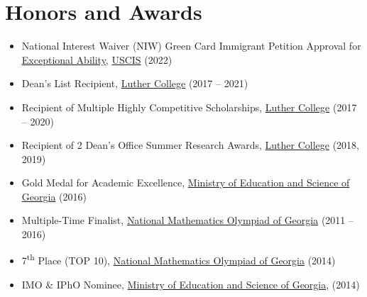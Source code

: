 \documentclass[a4paper]{article}
\newcommand{\entriesbegin}{\begin{itemize}[leftmargin=*]}
\newcommand{\entriesend}{\end{itemize}}
\newcommand{\entrysubitem}[1]{\item[\(\circ\)]\small{#1}\vspace{-4pt}}
\begin{document}


\section{Honors and Awards}

\entriesbegin
    \entrysubitem{National Interest Waiver (NIW) Green Card Immigrant Petition Approval for \href{https://www.uscis.gov/policy-manual/volume-6-part-f-chapter-5\#S-B}{Exceptional Ability}, \href{https://www.uscis.gov/}{USCIS} (2022)}
    \entrysubitem{Dean's List Recipient, \href{www.luther.edu}{Luther College} (2017 -- 2021)}
    \entrysubitem{Recipient of Multiple Highly Competitive Scholarships, \href{www.luther.edu}{Luther College} (2017 -- 2020)}
    \entrysubitem{Recipient of 2 Dean's Office Summer Research Awards, \href{www.luther.edu}{Luther College} (2018, 2019)}
    \entrysubitem{Gold Medal for Academic Excellence, \href{http://mes.gov.ge/?lang=eng}{Ministry of Education and Science of Georgia} (2016)}
    \entrysubitem{Multiple-Time Finalist, \href{https://naec.ge/}{National Mathematics Olympiad of Georgia} (2011 -- 2016)}
    \entrysubitem{7\textsuperscript{th} Place (TOP 10), \href{https://naec.ge/}{National Mathematics Olympiad of Georgia} (2014)}
    \entrysubitem{IMO \& IPhO Nominee, \href{http://mes.gov.ge/?lang=eng}{Ministry of Education and Science of Georgia}, (2014)}
\entriesend


\end{document}
